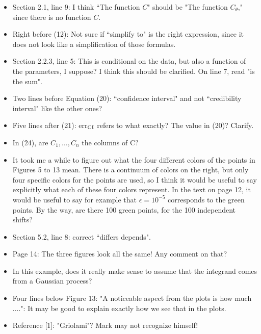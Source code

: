 \documentclass{amsart}
\begin{document}
\begin{itemize}
    \item Section 2.1, line 9: I think ``The function $C$" should be "The function $C_\theta$," since there is no function $C$.

\item Right before (12):  Not sure if ``simplify to" is the right expression, since it does not look like a simplification of those formulas.

\item Section 2.2.3, line 5: This is conditional on the data, but also a function of the parameters, I suppose?  I think this should be clarified.  On line 7, read "is the sum".

\item Two lines before Equation (20): ``confidence interval" and not ``credibility interval" like the other ones?

\item Five lines after (21): err$_{\rm CI}$ refers to what exactly? The value in (20)?  Clarify.

\item In (24), are $C_1,\dots,C_n$ the columns of C?

\item It took me a while to figure out what the four different colors of the points in Figures 5 to 13 mean.  There is a continuum of colors on the right, but only four specific colors for the points are used, so I think it would be useful to say explicitly what each of these four colors  represent.  In the text on page 12, it would be useful to say for example that $\epsilon = 10^{-5}$ corresponds to the green points.   By the way, are there 100 green points, for the 100 independent shifts?

\item Section 5.2, line 8: correct ``differs depends".

\item Page 14: The three figures look all the same!  Any comment on that?

\item In this example, does it really make sense to assume that the integrand comes from a Gaussian process?

\item Four lines below Figure 13:  "A noticeable aspect from the plots is how much ....":  It may be good to explain exactly how we see that in the plots.

\item Reference [1]:  "Griolami"?   Mark may not recognize himself!

\end{itemize}
\end{document}
